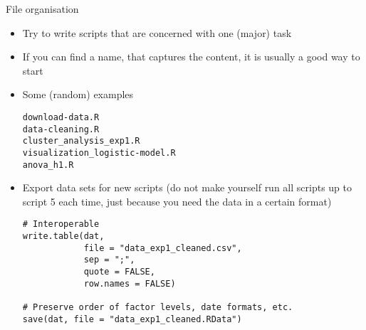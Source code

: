 \documentclass[aspectratio=169]{beamer}
\begin{document}
\begin{frame}{File organisation}
  \begin{itemize}
    \item Try to write scripts that are concerned with one (major) task
    \item If you can find a name, that captures the content, it is usually a
      good way to start
    \item Some (random) examples
\begin{lstlisting}[identifierstyle = \bfseries\color{iwmgray}]
download-data.R
data-cleaning.R
cluster_analysis_exp1.R
visualization_logistic-model.R
anova_h1.R
  \end{lstlisting}
  \framebreak

    \item Export data sets for new scripts (do not make yourself run all scripts
      up to script 5 each time, just because you need the data in a certain
      format)
      \begin{lstlisting}
# Interoperable
write.table(dat,
            file = "data_exp1_cleaned.csv",
            sep = ";",
            quote = FALSE,
            row.names = FALSE)

# Preserve order of factor levels, date formats, etc.
save(dat, file = "data_exp1_cleaned.RData")
      \end{lstlisting}
  \end{itemize}
\end{frame}
\end{document}
